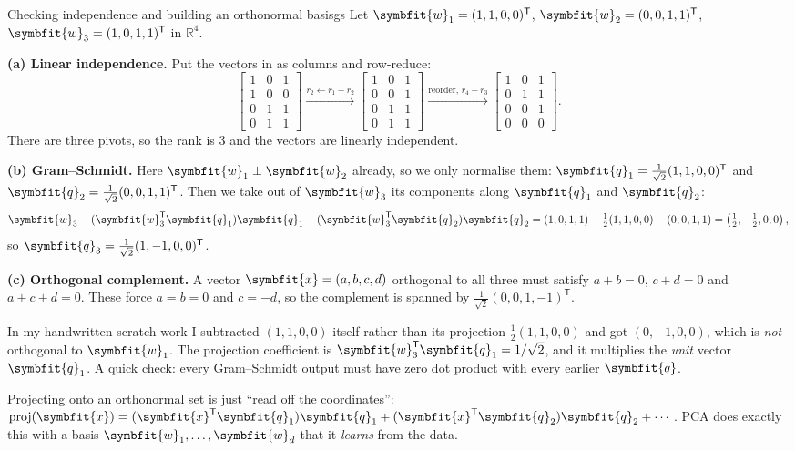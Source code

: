 \documentclass[11pt]{article}
\newcommand{\bm}[1]{\symbfit{#1}}
\newcommand{\R}{\mathbb{R}}
\newcommand{\vx}{\bm{x}}
\newcommand{\vw}{\bm{w}}
\newcommand{\vq}{\bm{q}}
\newcommand{\T}{^{\mathsf T}}
\newcommand{\proj}{\operatorname{proj}}
\begin{document}
\begin{example}{Checking independence and building an orthonormal basis}{gs}
Let $\vw_1=(1,1,0,0)\T$, $\vw_2=(0,0,1,1)\T$, $\vw_3=(1,0,1,1)\T$ in $\R^4$.

\textbf{(a) Linear independence.} Put the vectors in as columns and row-reduce:
\[
\begin{bmatrix}1&0&1\\1&0&0\\0&1&1\\0&1&1\end{bmatrix}
\xrightarrow{r_2\leftarrow r_1-r_2}
\begin{bmatrix}1&0&1\\0&0&1\\0&1&1\\0&1&1\end{bmatrix}
\xrightarrow{\text{reorder, } r_4-r_3}
\begin{bmatrix}1&0&1\\0&1&1\\0&0&1\\0&0&0\end{bmatrix}.
\]
There are three pivots, so the rank is $3$ and the vectors are linearly independent.

\textbf{(b) Gram--Schmidt.} Here $\vw_1\perp\vw_2$ already, so we only normalise them:
$\vq_1=\tfrac1{\sqrt2}(1,1,0,0)\T$ and $\vq_2=\tfrac1{\sqrt2}(0,0,1,1)\T$. Then we take
out of $\vw_3$ its components along $\vq_1$ and $\vq_2$:
\[
\vw_3-(\vw_3\T\vq_1)\vq_1-(\vw_3\T\vq_2)\vq_2
=(1,0,1,1)-\tfrac12(1,1,0,0)-(0,0,1,1)=\left(\tfrac12,-\tfrac12,0,0\right),
\]
so $\vq_3=\tfrac1{\sqrt2}(1,-1,0,0)\T$.

\textbf{(c) Orthogonal complement.} A vector $\vx=(a,b,c,d)$ orthogonal to all three
must satisfy $a+b=0$, $c+d=0$ and $a+c+d=0$. These force $a=b=0$ and $c=-d$, so
the complement is spanned by $\tfrac1{\sqrt2}(0,0,1,-1)\T$.
\end{example}

\begin{careful}
In my handwritten scratch work I subtracted $(1,1,0,0)$ itself rather than its
projection $\tfrac12(1,1,0,0)$ and got $(0,-1,0,0)$, which is \emph{not} orthogonal to
$\vw_1$. The projection coefficient is $\vw_3\T\vq_1=1/\sqrt2$, and it multiplies the
\emph{unit} vector $\vq_1$. A quick check: every Gram--Schmidt output must have zero
dot product with every earlier $\vq$.
\end{careful}

\begin{intuition}
Projecting onto an orthonormal set is just ``read off the coordinates'':
$\proj(\vx)=(\vx\T\vq_1)\vq_1+(\vx\T\vq_2)\vq_2+\cdots$. PCA does exactly this with a
basis $\vw_1,\dots,\vw_d$ that it \emph{learns} from the data.
\end{intuition}
\end{document}
